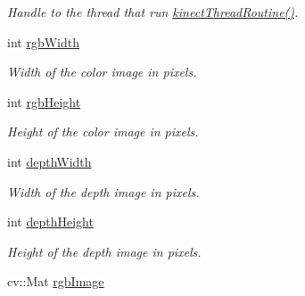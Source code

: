 \begin{DoxyCompactItemize}
\begin{DoxyCompactList}\small\item\em Handle to the thread that run \hyperlink{classpersonal_robotics_1_1_kinect_reader_a9263a03547aa8f9d401d3e2ad34f5e4f}{kinect\+Thread\+Routine()}. \end{DoxyCompactList}\item 
\hypertarget{classpersonal_robotics_1_1_kinect_reader_a95d4de164416824564674b8ee0ec97de}{}int \hyperlink{classpersonal_robotics_1_1_kinect_reader_a95d4de164416824564674b8ee0ec97de}{rgb\+Width}\label{classpersonal_robotics_1_1_kinect_reader_a95d4de164416824564674b8ee0ec97de}

\begin{DoxyCompactList}\small\item\em Width of the color image in pixels. \end{DoxyCompactList}\item 
\hypertarget{classpersonal_robotics_1_1_kinect_reader_aafddc6d28c178ff10260b42e1e36c1a8}{}int \hyperlink{classpersonal_robotics_1_1_kinect_reader_aafddc6d28c178ff10260b42e1e36c1a8}{rgb\+Height}\label{classpersonal_robotics_1_1_kinect_reader_aafddc6d28c178ff10260b42e1e36c1a8}

\begin{DoxyCompactList}\small\item\em Height of the color image in pixels. \end{DoxyCompactList}\item 
\hypertarget{classpersonal_robotics_1_1_kinect_reader_ad18fdd150ee1d257f5ecb2d6bbff34c2}{}int \hyperlink{classpersonal_robotics_1_1_kinect_reader_ad18fdd150ee1d257f5ecb2d6bbff34c2}{depth\+Width}\label{classpersonal_robotics_1_1_kinect_reader_ad18fdd150ee1d257f5ecb2d6bbff34c2}

\begin{DoxyCompactList}\small\item\em Width of the depth image in pixels. \end{DoxyCompactList}\item 
\hypertarget{classpersonal_robotics_1_1_kinect_reader_ab29a8788a51b831ac162367649fe74a8}{}int \hyperlink{classpersonal_robotics_1_1_kinect_reader_ab29a8788a51b831ac162367649fe74a8}{depth\+Height}\label{classpersonal_robotics_1_1_kinect_reader_ab29a8788a51b831ac162367649fe74a8}

\begin{DoxyCompactList}\small\item\em Height of the depth image in pixels. \end{DoxyCompactList}\item 
\hypertarget{classpersonal_robotics_1_1_kinect_reader_a32b1651f2e04d3d53a0f1bd6b0b490a1}{}cv\+::\+Mat \hyperlink{classpersonal_robotics_1_1_kinect_reader_a32b1651f2e04d3d53a0f1bd6b0b490a1}{rgb\+Image}\label{classpersonal_robotics_1_1_kinect_reader_a32b1651f2e04d3d53a0f1bd6b0b490a1}


\end{DoxyCompactItemize}
